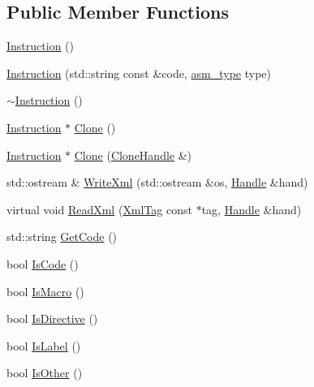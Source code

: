 \subsection*{Public Member Functions}
\begin{DoxyCompactItemize}
\item 
\hyperlink{classcfglib_1_1Instruction_afbca05ecb59e5a9b0b0027aadab48738}{Instruction} ()
\item 
\hyperlink{classcfglib_1_1Instruction_a22e42389cb62f96a0b28e3f7ebd1b323}{Instruction} (std\+::string const \&code, \hyperlink{namespacecfglib_a5ae32d51cf4ff1db5485367eab63a500}{asm\+\_\+type} type)
\item 
\hyperlink{classcfglib_1_1Instruction_aea2b37b89a6d029c20d0a49f1c89db66}{$\sim$\+Instruction} ()
\item 
\hyperlink{classcfglib_1_1Instruction}{Instruction} $\ast$ \hyperlink{classcfglib_1_1Instruction_a23db173ff853ab41327333fd8b87b61c}{Clone} ()
\item 
\hyperlink{classcfglib_1_1Instruction}{Instruction} $\ast$ \hyperlink{classcfglib_1_1Instruction_a32a5438b8eb037f9551518679e1c576a}{Clone} (\hyperlink{classcfglib_1_1CloneHandle}{Clone\+Handle} \&)
\item 
std\+::ostream \& \hyperlink{classcfglib_1_1Instruction_a1775270fdbf4f48e63d75c1327b51aa6}{Write\+Xml} (std\+::ostream \&os, \hyperlink{classcfglib_1_1Handle}{Handle} \&hand)
\item 
virtual void \hyperlink{classcfglib_1_1Instruction_a993641abc0297a715f66040d6ad7444c}{Read\+Xml} (\hyperlink{classXmlTag}{Xml\+Tag} const $\ast$tag, \hyperlink{classcfglib_1_1Handle}{Handle} \&hand)
\item 
std\+::string \hyperlink{classcfglib_1_1Instruction_a383f3ba3adf01b1596825b2314cdd5a9}{Get\+Code} ()
\item 
bool \hyperlink{classcfglib_1_1Instruction_accc89f23195a6da61676c34716e15527}{Is\+Code} ()
\item 
bool \hyperlink{classcfglib_1_1Instruction_aa0062264ffcc446ea706e15e3430543d}{Is\+Macro} ()
\item 
bool \hyperlink{classcfglib_1_1Instruction_a2611829fdb75f7be9545bbb2a0e0ff3f}{Is\+Directive} ()
\item 
bool \hyperlink{classcfglib_1_1Instruction_a28fda4549853eed5cb37e0330383b3bc}{Is\+Label} ()
\item 
bool \hyperlink{classcfglib_1_1Instruction_aff053b1bab7383efc4f563ad5b6b4c48}{Is\+Other} ()
\end{DoxyCompactItemize}


